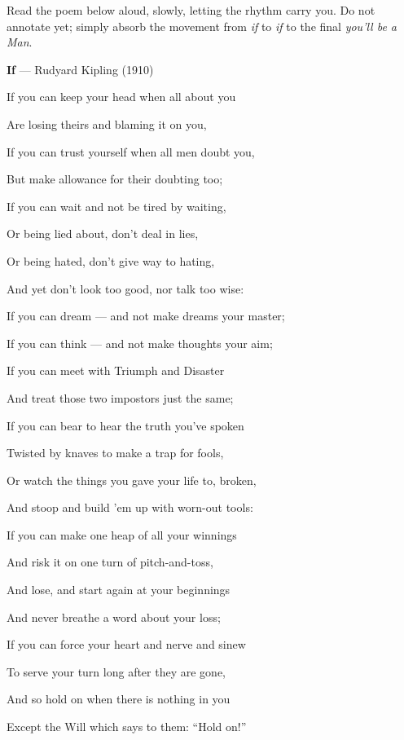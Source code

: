 \documentclass[11pt]{article}
\begin{document}
\begin{experience}
Read the poem below aloud, slowly, letting the rhythm carry you. Do not annotate yet; simply absorb the movement from \emph{if} to \emph{if} to the final \emph{you'll be a Man}.

\medskip
\noindent\textbf{If} — Rudyard Kipling (1910)

\medskip
\noindent If you can keep your head when all about you \par
Are losing theirs and blaming it on you,\par
If you can trust yourself when all men doubt you,\par
But make allowance for their doubting too;\par
If you can wait and not be tired by waiting,\par
Or being lied about, don't deal in lies,\par
Or being hated, don't give way to hating,\par
And yet don't look too good, nor talk too wise:\par

\medskip
\noindent If you can dream — and not make dreams your master;\par
If you can think — and not make thoughts your aim;\par
If you can meet with Triumph and Disaster\par
And treat those two impostors just the same;\par
If you can bear to hear the truth you've spoken\par
Twisted by knaves to make a trap for fools,\par
Or watch the things you gave your life to, broken,\par
And stoop and build 'em up with worn-out tools:\par

\medskip
\noindent If you can make one heap of all your winnings\par
And risk it on one turn of pitch-and-toss,\par
And lose, and start again at your beginnings\par
And never breathe a word about your loss;\par
If you can force your heart and nerve and sinew\par
To serve your turn long after they are gone,\par
And so hold on when there is nothing in you\par
Except the Will which says to them: ``Hold on!''\par


\end{experience}
\end{document}

